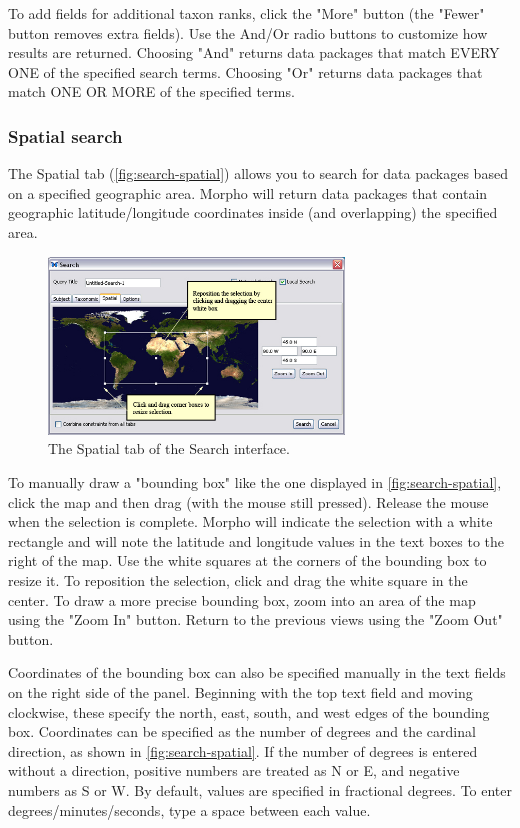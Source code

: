 To add fields for additional taxon ranks, click the "More" button (the
"Fewer" button removes extra fields). Use the And/Or radio buttons to
customize how results are returned. Choosing "And" returns data packages
that match EVERY ONE of the specified search terms. Choosing "Or"
returns data packages that match ONE OR MORE of the specified terms.

\subsubsection[Spatial]{Spatial search} \label{sec:search-spatial}

The Spatial tab (\autoref{fig:search-spatial}) allows you to search for data packages
based on a specified geographic area. Morpho will return data packages
that contain geographic latitude/longitude coordinates inside (and
overlapping) the specified area.

\begin{figure}
  \centering
    \includegraphics[width=0.7\textwidth]{images/search-spatial.jpg}
  \caption{The Spatial tab of the Search interface.}
  \label{fig:search-spatial}
\end{figure}

To manually draw a "bounding box" like the one displayed in
\autoref{fig:search-spatial}, click the map and then drag (with the
mouse still pressed). Release the mouse when the selection is complete.
Morpho will indicate the selection with a white rectangle and will note
the latitude and longitude values in the text boxes to the right of the
map. Use the white squares at the corners of the bounding box to resize
it. To reposition the selection, click and drag the white square in the
center.  To draw a more precise bounding box, zoom into an area of the
map using the "Zoom In" button. Return to the previous views using the
"Zoom Out" button. 

Coordinates of the bounding box can also be specified manually in the
text fields on the right side of the panel. Beginning with the top text
field and moving clockwise, these specify the north, east, south, and
west edges of the bounding box. Coordinates can be specified as the
number of degrees and the cardinal direction, as shown in
\autoref{fig:search-spatial}. If the number of degrees is entered
without a direction, positive numbers are treated as N or E, and
negative numbers as S or W. By default, values are specified in
fractional degrees. To enter degrees/minutes/seconds, type a space
between each value.

